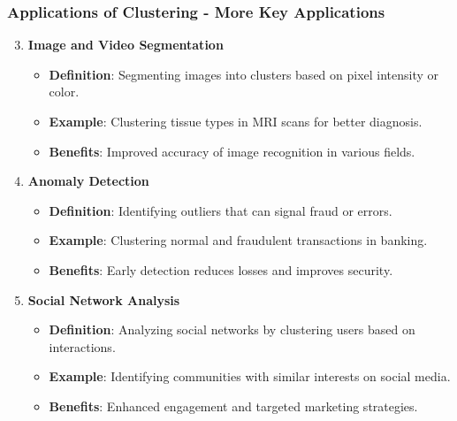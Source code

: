 \documentclass[aspectratio=169]{beamer}
\begin{document}
\begin{frame}[fragile]
  \frametitle{Applications of Clustering - More Key Applications}
  \begin{enumerate}
    \setcounter{enumi}{2}
    \item \textbf{Image and Video Segmentation}
      \begin{itemize}
        \item \textbf{Definition}: Segmenting images into clusters based on pixel intensity or color.
        \item \textbf{Example}: Clustering tissue types in MRI scans for better diagnosis.
        \item \textbf{Benefits}: Improved accuracy of image recognition in various fields.
      \end{itemize}

    \item \textbf{Anomaly Detection}
      \begin{itemize}
        \item \textbf{Definition}: Identifying outliers that can signal fraud or errors.
        \item \textbf{Example}: Clustering normal and fraudulent transactions in banking.
        \item \textbf{Benefits}: Early detection reduces losses and improves security.
      \end{itemize}

    \item \textbf{Social Network Analysis}
      \begin{itemize}
        \item \textbf{Definition}: Analyzing social networks by clustering users based on interactions.
        \item \textbf{Example}: Identifying communities with similar interests on social media.
        \item \textbf{Benefits}: Enhanced engagement and targeted marketing strategies.
      \end{itemize}
  \end{enumerate}
\end{frame}
\end{document}
